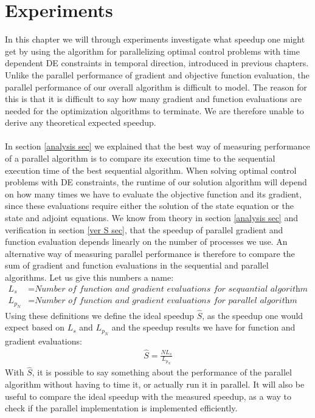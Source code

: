 \chapter{Experiments}\label{Experiments chapter}
In this chapter we will through experiments investigate what speedup one might get by using the algorithm for parallelizing optimal control problems with  time dependent DE constraints in temporal direction, introduced in previous chapters. Unlike the parallel performance of gradient and objective function evaluation, the parallel performance of our overall algorithm is difficult to model. The reason for this is that it is difficult to say how many gradient and function evaluations are needed for the optimization algorithms to terminate. We are therefore unable to derive any theoretical expected speedup.
\\
\\
In section \ref{analysis sec} we explained that the best way of measuring performance of a parallel algorithm is to compare its execution time to the sequential execution time of the best sequential algorithm. When solving optimal control problems with DE constraints, the runtime of our solution algorithm will depend on how many times we have to evaluate the objective function and its gradient, since these evaluations require either the solution of the state equation or the state and adjoint equations. We know from theory in section \ref{analysis sec} and verification in section \ref{ver S sec}, that the speedup of parallel gradient and function evaluation depends linearly on the number of processes we use. An alternative way of measuring parallel performance is therefore to compare the sum of gradient and function evaluations in the sequential and parallel algorithms. Let us give this numbers a name:
\begin{align*}
L_s &= \textit{Number of function and gradient evaluations for sequantial algorithm}\\
L_{p_N} &= \textit{Number of function and gradient evaluations for parallel algorithm using N processes}
\end{align*} 
Using these definitions we define the ideal speedup $\hat{S}$, as the speedup one would expect based on $L_s$ and $L_{p_N}$ and the speedup results we have for function and gradient evaluations:
\begin{align}
\hat S = \frac{NL_s}{L_{p_N}} \label{ideal S}
\end{align}
With $\hat S$, it is possible to say something about the performance of the parallel algorithm without having to time it, or actually run it in parallel. It will also be useful to compare the ideal speedup with the measured speedup, as a way to check if the parallel implementation is implemented efficiently.
